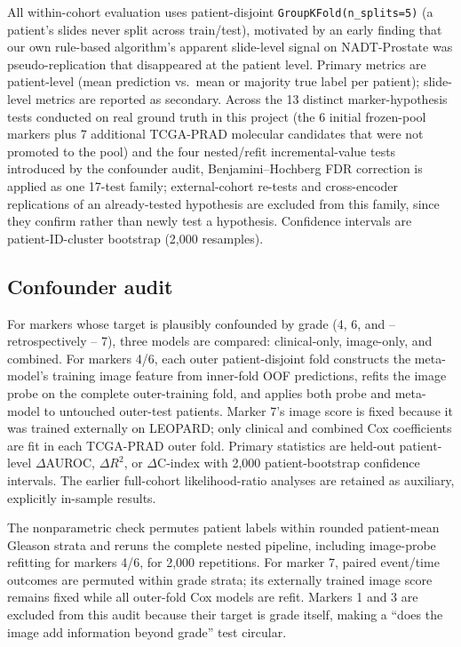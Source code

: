 All within-cohort evaluation uses patient-disjoint \texttt{GroupKFold(n\_splits=5)} (a
patient's slides never split across train/test), motivated by an early finding that our own
rule-based algorithm's apparent slide-level signal on NADT-Prostate was pseudo-replication that
disappeared at the patient level. Primary metrics are patient-level (mean prediction vs.\ mean
or majority true label per patient); slide-level metrics are reported as secondary. Across the
13 distinct marker-hypothesis tests conducted on real ground truth in this project (the 6
initial frozen-pool markers plus 7 additional TCGA-PRAD molecular candidates that were not
promoted to the pool) and the four nested/refit incremental-value tests introduced by the
confounder audit, Benjamini--Hochberg FDR correction is applied as one 17-test family;
external-cohort re-tests and cross-encoder replications of an already-tested hypothesis are
excluded from this family, since they confirm rather than newly test a hypothesis. Confidence
intervals are patient-ID-cluster bootstrap (2{,}000 resamples).

\subsection{Confounder audit}

For markers whose target is plausibly confounded by grade (4, 6, and -- retrospectively -- 7),
three models are compared: clinical-only, image-only, and combined. For markers 4/6, each
outer patient-disjoint fold constructs the meta-model's training image feature from inner-fold
OOF predictions, refits the image probe on the complete outer-training fold, and applies both
probe and meta-model to untouched outer-test patients. Marker 7's image score is fixed because
it was trained externally on LEOPARD; only clinical and combined Cox coefficients are fit in
each TCGA-PRAD outer fold. Primary statistics are held-out patient-level $\Delta$AUROC,
$\Delta R^2$, or $\Delta$C-index with 2{,}000 patient-bootstrap confidence intervals. The
earlier full-cohort likelihood-ratio analyses are retained as auxiliary, explicitly
in-sample results.

The nonparametric check permutes patient labels within rounded patient-mean Gleason strata and
reruns the complete nested pipeline, including image-probe refitting for markers 4/6, for
2{,}000 repetitions. For marker 7, paired event/time outcomes are permuted within grade
strata; its externally trained image score remains fixed while all outer-fold Cox models are
refit. Markers 1 and 3 are
excluded from this audit because their target is grade itself, making a ``does the image add
information beyond grade'' test circular.

